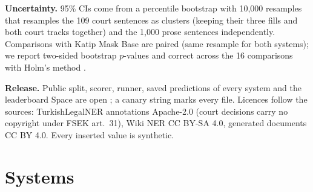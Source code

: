 \documentclass[10pt,twocolumn]{article}
\begin{document}
\textbf{Uncertainty.} 95\% CIs come from a percentile bootstrap \citep{efron1993} with 10,000 resamples that
resamples the 109 court sentences as clusters (keeping their three fills and both court tracks together) and the
1,000 prose sentences independently. Comparisons with Katip Mask Base are paired (same resample for both systems);
we report two-sided bootstrap $p$-values and correct across the 16 comparisons with Holm's method \citep{holm1979}.

\textbf{Release.} Public split, scorer, runner, saved predictions of every system and the leaderboard Space are
open \citep{firat2026kvkkbench,katip-repo}; a canary string marks every file. Licences follow the sources:
TurkishLegalNER annotations Apache-2.0 (court decisions carry no copyright under FSEK art.~31), Wiki NER
CC BY-SA 4.0, generated documents CC BY 4.0. Every inserted value is synthetic.

\section{Systems}
\label{sec:systems}
\end{document}
